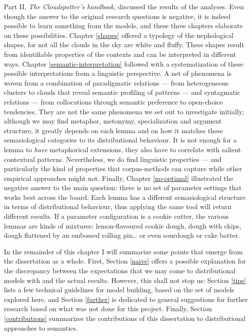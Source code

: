 \documentclass[
]{book}
\begin{document}
Part II, \emph{The Cloudspotter's handbook}, discussed the results of the analyses. Even though the answer to the original research questions is negative, it is indeed possible to learn something from the models, and these three chapters elaborate on these possibilities.
Chapter \ref{shapes} offered a typology of the nephological shapes, for not all the clouds in the sky are white and fluffy. These shapes result from identifiable properties of the contexts and can be interpreted in different ways.
Chapter \ref{semantic-interpretation} followed with a systematization of these possible interpretations from a linguistic perspective. A net of phenomena is woven from a combination of paradigmatic relations --- from heterogeneous clusters to clouds that reveal semantic profiling of patterns --- and syntagmatic relations --- from collocations through semantic preference to open-choice tendencies. They are not the same phenomena we set out to investigate initially; although we may find metaphor, metonymy, specialization and argument structure, it greatly depends on each lemma and on how it matches these semasiological categories to its distributional behaviour. It is not enough for a lemma to \emph{have} metaphorical extensions, they also have to correlate with salient contextual patterns. Nevertheless, we do find linguistic properties --- and particularly the kind of properties that corpus-methods can capture while other empirical approaches might not.
Finally, Chapter \ref{no-optimal} illustrated the negative answer to the main question: there is no set of parameter settings that works best across the board. Each lemma has a different semasiological structure in terms of distributional behaviour, thus applying the same tool will return different results. If a parameter configuration is a cookie cutter, the various lemmas are kinds of mixtures: lemon-flavoured cookie dough, dough with chips, dough flattened by an embossed rolling pin\ldots{} or even sourdough or cake batter.

In the remainder of this chapter I will summarize some points that emerge from the dissertation as a whole. First, Section \ref{naive} offers a possible explanation for the discrepancy between the expectations that we may come to distributional models with and the actual results. However, this shall not stop us: Section \ref{tips} lists a few technical guidelines for model building, based on the set of models explored here, and Section \ref{further} is dedicated to general suggestions for further research based on what was not done for this project. Finally, Section \ref{contributions} summarizes the contributions of this dissertation to distributional approaches to semantics.
\end{document}
